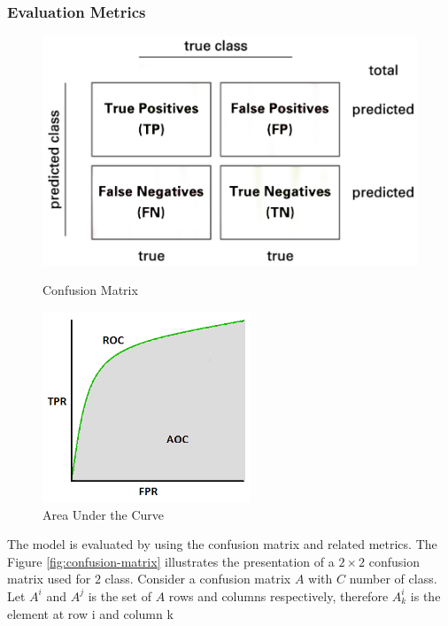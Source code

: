 \documentclass[sensors,article,submit,pdftex,moreauthors]{Definitions/mdpi}
\begin{document}
\subsubsection{Evaluation Metrics}
\begin{figure}[!htb]
	\begin{minipage}{0.48\textwidth}
		\centering
		\includegraphics[width=1.1\linewidth]{Definitions/Confusion-matrix}
		\caption{Confusion Matrix}\label{fig:confusion-matrix}
	\end{minipage}\hfill
	\begin{minipage}{0.48\textwidth}
		\centering
		\includegraphics[width=.7\linewidth]{Definitions/AUC}
		\caption{Area Under the Curve}\label{fig:AUC}
	\end{minipage}
\end{figure}
The model is evaluated by using the confusion matrix and related metrics. The Figure \ref{fig:confusion-matrix} illustrates the presentation of a $2 \times 2$ confusion matrix used for $2$ class. Consider a confusion matrix $A$ with $C$ number of class. Let $A^i$ and $A^j$ is the set of $A$ rows and columns respectively, therefore $A^i_k$ is the element at row i and column k
\end{document}
